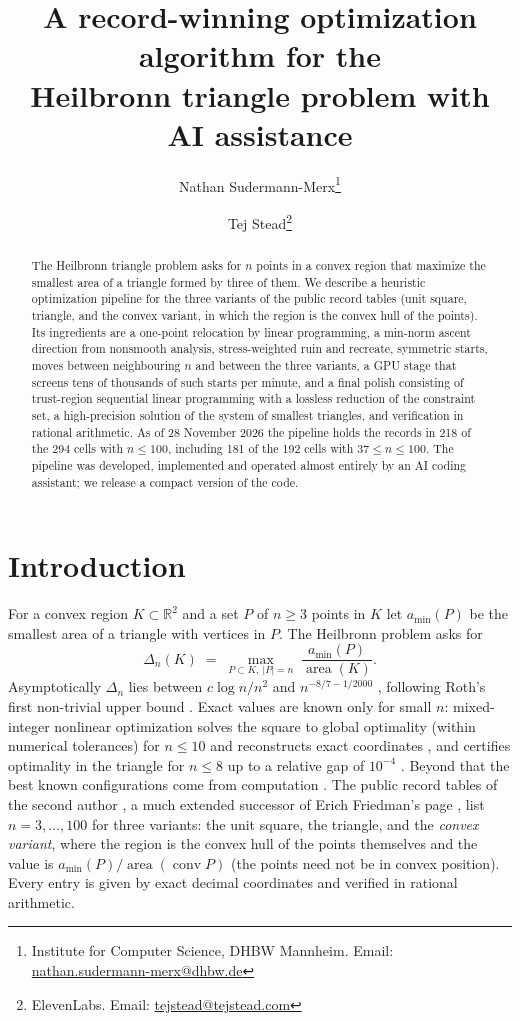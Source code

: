 \documentclass[11pt]{article}
\title{A record-winning optimization algorithm for the\\ Heilbronn triangle problem with AI assistance}
\author{Nathan Sudermann-Merx\thanks{Institute for Computer Science, DHBW Mannheim. Email: \href{mailto:nathan.sudermann-merx@dhbw.de}{nathan.sudermann-merx@dhbw.de}}
\and Tej Stead\thanks{ElevenLabs. Email: \href{mailto:tejstead@tejstead.com}{tejstead@tejstead.com}}}
\date{\StateDate}
\theoremstyle{remark}
\newcommand{\conv}{\operatorname{conv}}
\newcommand{\area}{\operatorname{area}}
\newcommand{\amin}{a_{\min}}
\newcommand{\R}{\mathbb{R}}
\newcommand{\StateDate}{28 November 2026}
\newcommand{\NOurs}{218}
\newcommand{\NCells}{294}
\newcommand{\NOursBig}{181}
\newcommand{\NBig}{192}
\begin{document}
\maketitle

\begin{abstract}
The Heilbronn triangle problem asks for $n$ points in a convex region that maximize the smallest area of a
triangle formed by three of them. We describe a heuristic optimization pipeline for the three variants of the public
record tables (unit square, triangle, and the convex variant, in which the region is the convex hull of the points).
Its ingredients are a one-point relocation by linear programming, a min-norm ascent direction from nonsmooth analysis, stress-weighted ruin and recreate, symmetric
starts, moves between neighbouring $n$ and between the three variants, a GPU stage that screens tens of thousands of
such starts per minute, and a final polish consisting of trust-region sequential linear programming with a lossless
reduction of the constraint set, a high-precision solution of the system of smallest triangles, and verification in rational
arithmetic. As of \StateDate{} the pipeline holds the records in \NOurs{} of the \NCells{} cells with $n \le 100$,
including \NOursBig{} of the \NBig{} cells with $37 \le n \le 100$. The pipeline was developed, implemented and operated almost
entirely by an AI coding assistant; we release a compact version of the code.
\end{abstract}

\section{Introduction}

For a convex region $K \subset \R^2$ and a set $P$ of $n \ge 3$ points in $K$ let $\amin(P)$ be the smallest area of a
triangle with vertices in $P$. The Heilbronn problem asks for
\[
  \Delta_n(K) \;=\; \max_{P \subset K,\ |P| = n} \; \frac{\amin(P)}{\area(K)} .
\]
Asymptotically $\Delta_n$ lies between $c \log n / n^2$ \cite{KPS82} and $n^{-8/7-1/2000}$ \cite{CPZ23}, following
Roth's first non-trivial upper bound \cite{Roth51}. Exact values are known only for small $n$: mixed-integer nonlinear
optimization solves the square to global optimality (within numerical tolerances) for $n \le 10$ and reconstructs
exact coordinates \cite{SM26a}, and certifies
optimality in the triangle for $n \le 8$ up to a relative gap of $10^{-4}$ \cite{SM26b}. Beyond that the best known
configurations come from computation \cite{Goldberg72,CY02,AlphaEvolve}. The public record tables of the second author \cite{HSite}, a much extended
successor of Erich Friedman's page \cite{Friedman}, list $n = 3, \dots, 100$ for three variants: the unit square, the triangle, and the
\emph{convex variant}, where the region is the convex hull of the points themselves and the value is
$\amin(P)/\area(\conv P)$ (the points need not be in convex position). Every entry is given by exact decimal coordinates and verified in rational arithmetic.
\end{document}

